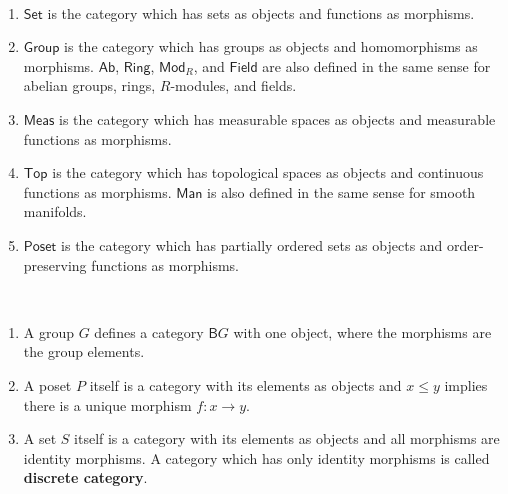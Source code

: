 \begin{exmp}
~\begin{enumerate}
\item $\mathsf{Set}$ is the category which has sets as objects and functions as morphisms.
\item $\mathsf{Group}$ is the category which has groups as objects and homomorphisms as morphisms. $\mathsf{Ab}$, $\mathsf{Ring}$, $\mathsf{Mod}_R$, and $\mathsf{Field}$ are also defined in the same sense for abelian groups, rings, $R$-modules, and fields.
\item $\mathsf{Meas}$ is the category which has measurable spaces as objects and measurable functions as morphisms.
\item $\mathsf{Top}$ is the category which has topological spaces as objects and continuous functions as morphisms. $\mathsf{Man}$ is also defined in the same sense for smooth manifolds.
\item $\mathsf{Poset}$ is the category which has partially ordered sets as objects and order-preserving functions as morphisms.
\end{enumerate}
\end{exmp}


\begin{exmp}
~\begin{enumerate}
\item A group $G$ defines a category $\mathsf{B}G$ with one object, where the morphisms are the group elements.
\item A poset $P$ itself is a category with its elements as objects and $x\leq y$ implies there is a unique morphism $f:x\rightarrow y$.
\item A set $S$ itself is a category with its elements as objects and all morphisms are identity morphisms. A category which has only identity morphisms is called \textbf{discrete category}.
\end{enumerate}
\end{exmp}

